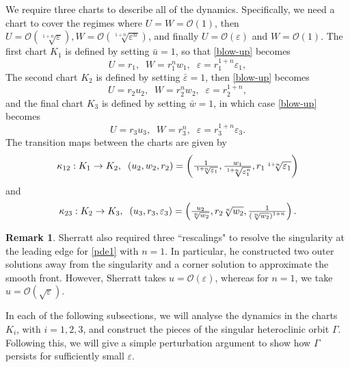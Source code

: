\documentclass{article}
\theoremstyle{definition}
\numberwithin{equation}{section}
\newtheorem{remark}[prop]{Remark}
\begin{document}
We require three charts to describe all of the dynamics. Specifically, we need a chart to cover the regimes where $U=W=\mathcal{O}(1)$, then $U=\mathcal{O}(\sqrt[1+n]{\varepsilon}), W=\mathcal{O}(\sqrt[1+n]{\varepsilon^n})$, and finally  $U=\mathcal{O}(\varepsilon)$ and $W=\mathcal{O}(1)$. 
The first chart $K_1$ is defined by setting $\bar{u}=1$, so that \eqref{blow-up} becomes
\begin{equation}
    U=r_1, \;\; W=r_1^nw_1,\;\; \varepsilon=r_1^{1+n}\varepsilon_1,
    \label{blow-up in K1}
\end{equation}
The second chart $K_2$ is defined by setting 
$\bar{\varepsilon}=1$, then \eqref{blow-up} becomes 
\begin{equation}
    U=r_2u_2, \;\; W=r_2^nw_2,\;\; \varepsilon=r_2^{1+n},
    \label{blow-up in K2}
\end{equation}
and the final chart $K_3$ is defined by setting 
$\bar{w}=1$, in which case \eqref{blow-up} becomes 
\begin{equation}
    U=r_3u_3, \;\; W=r_3^n,\;\; \varepsilon=r_3^{1+n}\varepsilon_3.
    \label{blow-up in K3}
\end{equation}
The transition maps between the charts are given by 
\begin{equation}
    \kappa_{12}:K_1\to K_2,\;\;(u_2, w_2, r_2)=\left(\tfrac{1}{\sqrt[1+n]{\varepsilon_1}}, \tfrac{w_1}{\sqrt[1+n]{\varepsilon_1^n}}, r_1\sqrt[1+n]{\varepsilon_1}\right)
    \label{transion map kappa_{12}}
\end{equation}
and \begin{equation}
    \kappa_{23}:K_2\to K_3,\;\;(u_3, r_3, \varepsilon_3)=\left(\tfrac{u_2}{\sqrt[n]{w_2}}, r_2\sqrt[n]{w_2}, \tfrac{1}{\left(\sqrt[n]{w_2}\right)^{1+n}}\right).
    \label{transion map kappa_{23}}
\end{equation}
\begin{remark}
    Sherratt \cite{Sherratt2010} also required three ``rescalings" to resolve the singularity at the leading edge for \eqref{pde1} with $n=1$. In particular, he constructed two outer solutions away from the singularity and a corner solution to approximate the smooth front. However, Sherratt takes $u=\mathcal{O}(\varepsilon)$, whereas for $n=1$, we take $u=\mathcal{O}(\sqrt{\varepsilon})$.
\end{remark}
In each of the following subsections, we will analyse the dynamics in the charts $K_i$, with $i=1,2,3$, and construct the pieces of the singular heteroclinic orbit $\Gamma$. Following this, we will give a simple perturbation argument to show how $\Gamma$ persists for sufficiently small $\varepsilon$.
\end{document}
